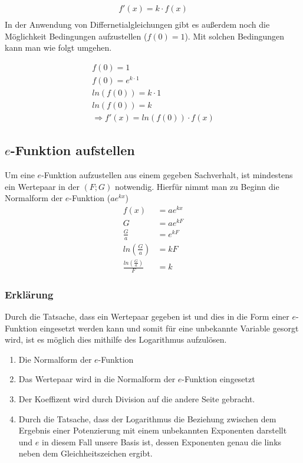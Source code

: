 \begin{beispiel}
	\begin{align*}
		f'(x)=k\cdot f(x)\\
	\end{align*}
In der Anwendung von Differnetialgleichungen gibt es außerdem noch die Möglichkeit Bedingungen aufzustellen ($f(0)=1$). Mit solchen Bedingungen kann man wie folgt umgehen.

\begin{beispiel}
\begin{align*}
	f(0)=1\tag{Bedingung}\\
	f(0)=e^{k\cdot 1}\tag{Nach $k$ auflösen}\\
	ln(f(0))=k\cdot 1\tag{Dividieren durch 1}\\
	ln(f(0))=k\\
	\Rightarrow f'(x)=ln(f(0))\cdot f(x)
\end{align*}
\end{beispiel}

\subsection{$e$-Funktion aufstellen}
Um eine $e$-Funktion aufzustellen aus einem gegeben Sachverhalt, ist mindestens ein Wertepaar in der $(F;G)$ notwendig. Hierfür nimmt man zu Beginn die Normalform der $e$-Funktion ($ae^{kx}$)
\begin{align}
	f(x)&=ae^{kx}\\
	G&=ae^{kF}\\
	\frac{G}{a}&=e^{kF}\\
	ln\left(\frac{G}{a}\right)&=kF\\
	\frac{ln\left(\frac{G}{a}\right)}{F}&=k
\end{align}
\subsubsection{Erklärung}
Durch die Tatsache, dass ein Wertepaar gegeben ist und dies in die Form einer $e$-Funktion eingesetzt werden kann und somit für eine unbekannte Variable gesorgt wird, ist es möglich dies mithilfe des Logarithmus aufzulösen.
\begin{enumerate}
	\item Die Normalform der $e$-Funktion
	\item Das Wertepaar wird in die Normalform der $e$-Funktion eingesetzt
	\item Der Koeffizent wird durch Division auf die andere Seite gebracht. 
	\item Durch die Tatsache, dass der Logarithmus die Beziehung zwischen dem Ergebnis einer Potenzierung mit einem unbekannten Exponenten darstellt und $e$ in diesem Fall unsere Basis ist, dessen Exponenten genau die links neben dem Gleichheitszeichen ergibt. 
\end{enumerate}


\end{beispiel}
